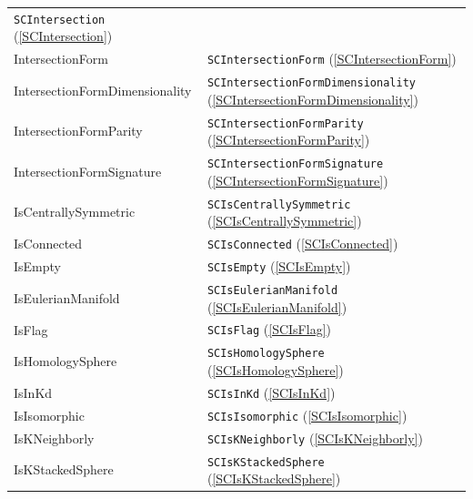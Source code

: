 \documentclass[a4paper,11pt]{report}
\begin{document}
{{\begin{center}
\begin{tabular}{ll}
\texttt{SCIntersection} (\ref{SCIntersection})\\
IntersectionForm&
\texttt{SCIntersectionForm} (\ref{SCIntersectionForm})\\
IntersectionFormDimensionality&
\texttt{SCIntersectionFormDimensionality} (\ref{SCIntersectionFormDimensionality})\\
IntersectionFormParity&
\texttt{SCIntersectionFormParity} (\ref{SCIntersectionFormParity})\\
IntersectionFormSignature&
\texttt{SCIntersectionFormSignature} (\ref{SCIntersectionFormSignature})\\
IsCentrallySymmetric&
\texttt{SCIsCentrallySymmetric} (\ref{SCIsCentrallySymmetric})\\
IsConnected&
\texttt{SCIsConnected} (\ref{SCIsConnected})\\
IsEmpty&
\texttt{SCIsEmpty} (\ref{SCIsEmpty})\\
IsEulerianManifold&
\texttt{SCIsEulerianManifold} (\ref{SCIsEulerianManifold})\\
IsFlag&
\texttt{SCIsFlag} (\ref{SCIsFlag})\\
IsHomologySphere&
\texttt{SCIsHomologySphere} (\ref{SCIsHomologySphere})\\
IsInKd&
\texttt{SCIsInKd} (\ref{SCIsInKd})\\
IsIsomorphic&
\texttt{SCIsIsomorphic} (\ref{SCIsIsomorphic})\\
IsKNeighborly&
\texttt{SCIsKNeighborly} (\ref{SCIsKNeighborly})\\
IsKStackedSphere&
\texttt{SCIsKStackedSphere} (\ref{SCIsKStackedSphere})\\
\end{tabular}\\[2mm]
\end{center}

}}
\end{document}
